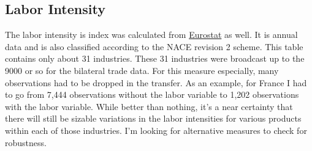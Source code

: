 \documentclass[11pt]{article}
\begin{document}
\subsection{Labor Intensity}
\label{sub:labor_intensity}

  The labor intensity is index was calculated from \href{http://appsso.eurostat.ec.europa.eu/nui/show.do?dataset=sts_inlb_a&lang=en}{Eurostat} as well.  It is annual data and is also classified according to the NACE revision 2 scheme.  This table contains only about 31 industries.  These 31 industries were broadcast up to the 9000 or so for the bilateral trade data.  For this measure especially, many observations had to be dropped in the transfer. As an example, for France I had to go from 7,444 observations without the labor variable to 1,202 observations with the labor variable. While better than nothing, it's a near certainty that there will still be sizable variations in the labor intensities for various products within each of those industries.  I'm looking for alternative measures to check for robustness.



\end{document}
